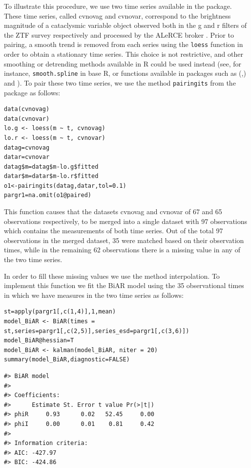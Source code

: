 To illustrate this procedure, we use two time series available in the  package. These time series, called cvnovag and cvnovar, correspond to the brightness magnitude of a cataclysmic variable object observed both in the g and r filters of the ZTF survey respectively and processed by the ALeRCE broker \citep{Forster_2021}. Prior to pairing, a smooth trend is removed from each series using the \texttt{loess} function in order to obtain a stationary time series. This choice is not restrictive, and other smoothing or detrending methods available in R could be used instead (see, for instance, \texttt{smooth.spline} in base R, or functions available in packages such as  (\citet{Wood2001},\citet{Wood2017}) and  \citep{HyndmanKhandakar2008}). To pair these two time series, we use the method \texttt{pairingits} from the  package as follows:

\begin{verbatim}
data(cvnovag)
data(cvnovar)
lo.g <- loess(m ~ t, cvnovag)
lo.r <- loess(m ~ t, cvnovar)
datag=cvnovag
datar=cvnovar
datag$m=datag$m-lo.g$fitted
datar$m=datar$m-lo.r$fitted
o1<-pairingits(datag,datar,tol=0.1)
pargr1=na.omit(o1@paired)
\end{verbatim}

This function causes that the datasets cvnovag and cvnovar of 67 and 65 observations respectively, to be merged into a single dataset with 97 observations which contains the measurements of both time series. Out of the total 97 observations in the merged dataset, 35 were matched based on their observation times, while in the remaining 62 observations there is a missing value in any of the two time series.

In order to fill these missing values we use the method interpolation. To implement this function we fit the BiAR model using the 35 observational times in which we have measures in the two time series as follows:

\begin{verbatim}
st=apply(pargr1[,c(1,4)],1,mean)
model_BiAR <- BiAR(times = st,series=pargr1[,c(2,5)],series_esd=pargr1[,c(3,6)])
model_BiAR@hessian=T
model_BiAR <- kalman(model_BiAR, niter = 20)
summary(model_BiAR,diagnostic=FALSE)
\end{verbatim}

\begin{verbatim}
#> BiAR model
#> 
#> Coefficients:
#>      Estimate St. Error t value Pr(>|t|)
#> phiR     0.93      0.02   52.45     0.00
#> phiI     0.00      0.01    0.81     0.42
#> 
#> Information criteria:
#> AIC: -427.97 
#> BIC: -424.86
\end{verbatim}

